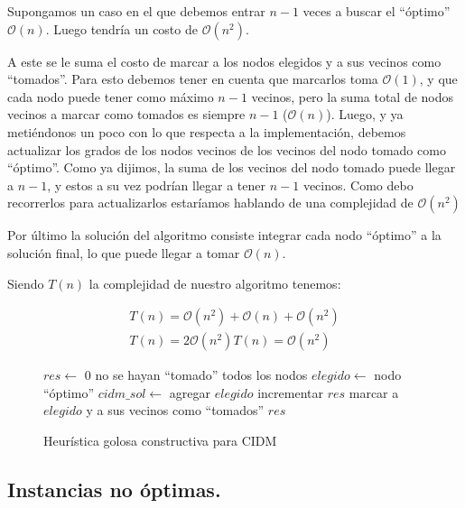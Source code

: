 Supongamos un caso en el que debemos entrar $n-1$ veces a buscar el ``óptimo'' $\mathcal{O}(n)$. Luego tendría un costo de $\mathcal{O}(n^2)$.

A este se le suma el costo de marcar a los nodos elegidos y a sus vecinos como ``tomados''. Para esto debemos tener en cuenta que marcarlos toma $\mathcal{O}(1)$, y que cada nodo puede tener como máximo $n-1$ vecinos, pero la suma total de nodos vecinos a marcar como tomados es siempre $n-1$ ($\mathcal{O}(n)$). Luego, y ya metiéndonos un poco con lo que respecta a la implementación, debemos actualizar los grados de los nodos vecinos de los vecinos del nodo tomado como ``óptimo''. Como ya dijimos, la suma de los vecinos del nodo tomado puede llegar a $n-1$, y estos a su vez podrían llegar a tener $n-1$ vecinos. Como debo recorrerlos para actualizarlos estaríamos hablando de una complejidad de $\mathcal{O}(n^2)$


Por último la solución del algoritmo consiste integrar cada nodo ``óptimo'' a la solución final, lo que puede llegar a tomar $\mathcal{O}(n)$.

Siendo $T(n)$ la complejidad de nuestro algoritmo tenemos:

\begin{equation*}
\begin{array}{l}
T(n) = \mathcal{O}(n^2) + \mathcal{O}(n) + \mathcal{O}(n^2)\\
T(n) = 2\mathcal{O}(n^2)
T(n) = \mathcal{O}(n^2)
\end{array}
\end{equation*}

\begin{figure}
\begin{codebox}
\li $res \leftarrow$ 0
\li \While no se hayan ``tomado'' todos los nodos
\li 	\Do 
 		$elegido \leftarrow$ nodo ``óptimo''
\li 		$cidm\_sol \leftarrow$ agregar $elegido$
\li 		incrementar $res$
\li 		marcar a $elegido$ y a sus vecinos como ``tomados''
	\End
\li \Return $res$
\end{codebox}
\caption{Heurística golosa constructiva para CIDM}\label{code:goloso}
\end{figure}

\vspace*{0.6cm}

\subsection{Instancias no óptimas.}

